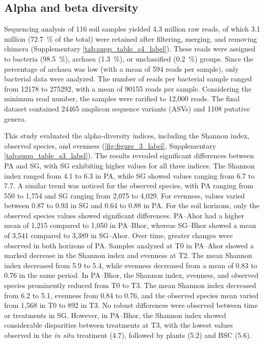 \subsection{Alpha and beta diversity}

Sequencing analysis of 116 soil samples yielded 4.3 million raw reads, of which 3.1 million (\SI{72.7}{\percent} of the total) were retained after filtering, merging, and removing chimera (Supplementary \cref{tab:supp_table_s4_label}). These reads were assigned to bacteria (\SI{98.5}{\percent}), archaea (\SI{1.3}{\percent}), or unclassified (\SI{0.2}{\percent}) groups. Since the percentage of archaea was low (with a mean of 594 reads per sample), only bacterial data were analyzed. The number of reads per bacterial sample ranged from \num{12178} to \num{275292}, with a mean of \num{90155} reads per sample. Considering the minimum read number, the samples were rarified to 12,000 reads. The final dataset contained \num{24465} amplicon sequence variants (ASVs) and \num{1108} putative genera.

This study evaluated the alpha-diversity indices, including the Shannon index, observed species, and evenness (\cref{fig:figure_3_label}, Supplementary \cref{tab:supp_table_s3_label}). The results revealed significant differences between PA and SG, with SG exhibiting higher values for all three indices. The Shannon index ranged from 4.1 to 6.3 in PA, while SG showed values ranging from 6.7 to 7.7. A similar trend was noticed for the observed species, with PA ranging from 550 to 1,754 and SG ranging from 2,075 to 4,029. For evenness, values varied between 0.87 to 0.93 in SG and 0.64 to 0.88 in PA. For the soil horizons, only the observed species values showed significant differences. PA--Ahor had a higher mean of 1,215 compared to 1,050 in PA--Bhor, whereas SG--Bhor showed a mean of 3,541 compared to 3,389 in SG--Ahor. Over time, greater changes were observed in both horizons of PA. Samples analyzed at T0 in PA--Ahor showed a marked decrease in the Shannon index and evenness at T2. The mean Shannon index decreased from 5.9 to 5.4, while evenness decreased from a mean of 0.83 to 0.76 in the same period. In PA--Bhor, the Shannon index, evenness, and observed species prominently reduced from T0 to T3. The mean Shannon index decreased from 6.2 to 5.1, evenness from 0.84 to 0.76, and the observed species mean varied from 1,568 in T0 to 892 in T3. No robust differences were observed between time or treatments in SG. However, in PA--Bhor, the Shannon index showed considerable disparities between treatments at T3, with the lowest values observed in the \textit{in situ} treatment (4.7), followed by plants (5.2) and BSC (5.6).

